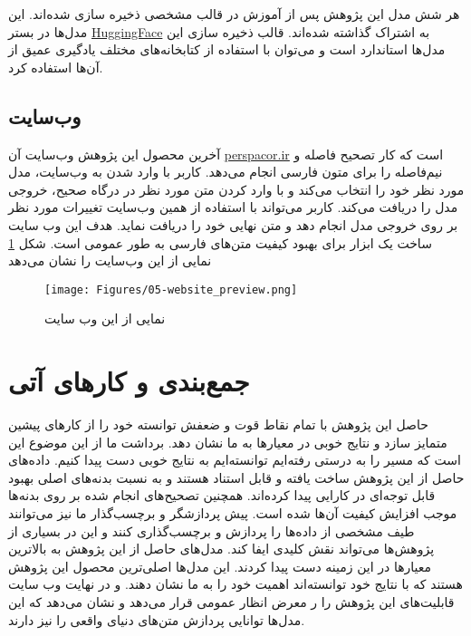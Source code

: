 هر شش مدل این پژوهش پس از آموزش در قالب مشخصی ذخیره سازی شده‌اند. این مدل‌ها در بستر \hyperlink{https://huggingface.co/PerSpaCor}{HuggingFace}  به اشتراک گذاشته شده‌اند. قالب ذخیره سازی این مدل‌ها استاندارد است و می‌توان با استفاده از کتابخانه‌های مختلف یادگیری عمیق از آن‌ها استفاده کرد.

\section{وب‌سايت}
\hspace{30pt}
آخرین محصول این پژوهش وب‌سايت آن \hyperlink{https://perspacor.ir/}{perspacor.ir}  است که کار تصحیح فاصله و نیم‌فاصله را برای متون فارسی انجام می‌دهد. کاربر با وارد شدن به وب‌سایت، مدل مورد نظر خود را انتخاب می‌کند و با وارد کردن متن مورد نظر در درگاه صحیح، خروجی مدل را دریافت می‌کند. کاربر می‌تواند با استفاده از همین وب‌سایت تغییرات مورد نظر بر روی خروجی مدل انجام دهد و متن نهایی خود را دریافت نماید.
هدف این وب سایت ساخت یک ابزار برای بهبود کیفیت متن‌های فارسی به طور عمومی است. شکل \ref{fig:website_preview} نمایی از این وب‌سایت را نشان می‌دهد
\begin{figure}[H]
      \centering
      \texttt{[image: Figures/05-website\_preview.png]}
      \caption{  نمایی از این وب سایت }
      \label{fig:website_preview}
  \end{figure}
\chapter{جمع‌بندی و کارهای آتی}
حاصل این پژوهش با تمام نقاط قوت و ضعفش توانسته خود را از کارهای پیشین متمایز سازد و نتایج خوبی در معیارها به ما نشان دهد. برداشت ما از این موضوع این است که مسیر را به درستی رفته‌ایم  توانسته‌ایم به نتایج خوبی دست پیدا کنیم. داده‌های حاصل از این پژوهش ساخت یافته و قابل استناد هستند و به نسبت بدنه‌های اصلی بهبود قابل توجه‌ای در کارایی پیدا کرده‌اند. همچنین تصحیح‌های انجام شده بر روی بدنه‌ها موجب افزایش کیفیت آن‌ها شده است. پیش پردازشگر و برچسب‌گذار ما نیز می‌توانند طیف مشخصی از داده‌ها را پردازش و برچسب‌گذاری کنند و این در بسیاری از پژوهش‌ها می‌تواند نقش کلیدی ایفا کند. مدل‌های حاصل از این پژوهش به بالاترین معیارها در این زمینه دست پیدا کردند. این مدل‌ها اصلی‌ترین محصول این پژوهش هستند که با نتایج خود توانسته‌اند اهمیت خود را به ما نشان دهند.
و در نهایت وب سایت  قابلیت‌های این پژوهش را ر معرض انظار عمومی قرار می‌دهد و نشان می‌دهد که این مدل‌ها توانایی پردازش متن‌های دنیای واقعی را نیز دارند.


